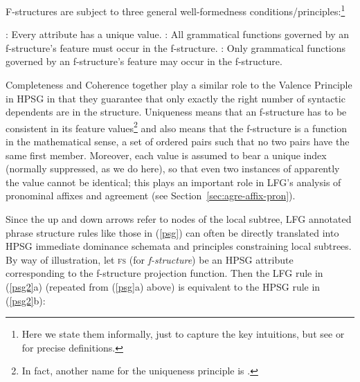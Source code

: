 \noindent
F-structures are subject to three general well-formedness conditions/principles:\footnote{Here we state them informally, just to capture the key intuitions, but see \citet{KB82a-u} or \citet[52--53]{dalrymple;ea19} for precise definitions.}
%
\begin{exe}
  \ex {}: 
Every attribute has a unique value.
\ex {}: All grammatical functions governed by an f-structure's  feature must occur in the f-structure. 
  \ex {}: Only grammatical functions governed by an f-structure's  feature may occur in the f-structure.
\end{exe}
%
Completeness and Coherence together play a similar role to the Valence Principle in HPSG \citep[348]{ps2} in that they guarantee that only exactly the right number of syntactic dependents are in the structure.  Uniqueness means that an f-structure has to be consistent in its feature values\footnote{In fact, another name for the uniqueness principle is  \citep[53]{dalrymple;ea19}.} and also means that the f-structure is a function in the mathematical sense, a set of ordered pairs such that no two pairs have the same first member. Moreover, each  value is assumed to bear a unique index (normally suppressed, as we do here), so that even two instances of apparently the   value cannot be identical; this plays an important role in LFG's analysis of pronominal affixes and agreement (see Section~\ref{sec:agre-affix-pron}).


Since the up and down arrows refer to nodes of the local subtree, LFG annotated phrase structure rules like those in (\ref{psg}) can often be directly translated into HPSG immediate dominance schemata and principles constraining local subtrees.  
By way of illustration, let \textsc{fs} (for \textit{f-structure}) be an HPSG attribute corresponding to the f-structure projection function.  Then the LFG rule in (\ref{psg2}a) (repeated from (\ref{psg}a) above) is equivalent to the  HPSG rule in (\ref{psg2}b):

\eal 
 \label{psg2}
\ex
{
}
               
\ex 
{
}
\zl

